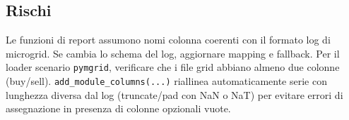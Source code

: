 \subsection*{Rischi}
Le funzioni di report assumono nomi colonna coerenti con il formato log di microgrid. Se cambia lo schema del log, aggiornare mapping e fallback.
Per il loader scenario \texttt{pymgrid}, verificare che i file grid abbiano almeno due colonne (buy/sell).
\texttt{add\_module\_columns(...)} riallinea automaticamente serie con lunghezza diversa dal log (truncate/pad con NaN o NaT) per evitare errori di assegnazione in presenza di colonne opzionali vuote.
